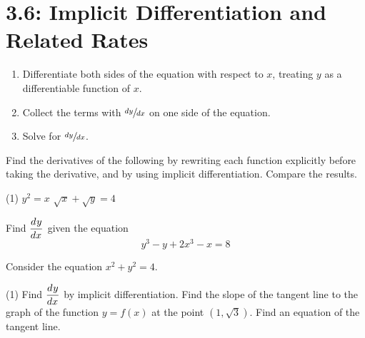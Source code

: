 \documentclass[../mathNotesPreamble]{subfiles}
\begin{document}
  \section{3.6: Implicit Differentiation and Related Rates}
  
  \pagebreak

  \begin{thmBox*}
    \begin{enumerate}
      \item Differentiate both sides of the equation with respect to $x$, treating $y$ as a \newline differentiable function of $x$.
      \item Collect the terms with $\sfrac{dy}{dx}$ on one side of the equation.
      \item Solve for $\sfrac{dy}{dx}$.
    \end{enumerate}
  \end{thmBox*}
  \begin{ex*}
    Find the derivatives of the following by rewriting each function explicitly before taking the derivative, and by using implicit differentiation. Compare the results.
  \end{ex*}
  \begin{extasks}[after-item-skip=\stretch{1}](1)
    \task $y^2=x$
    \task $\sqrt x+\sqrt y=4$
  \end{extasks}
  \pagebreak

  \begin{ex*}
    Find $\displaystyle{\frac{d^{}y}{dx^{}}}$ given the equation
    \[y^3-y+2x^3-x=8\]
  \end{ex*}
  \pagebreak
  
  \begin{ex*}
    Consider the equation $x^2+y^2=4$.
  \end{ex*}
  \begin{extasks}[after-item-skip=\stretch{1}](1)
    \task Find $\displaystyle{\frac{d^{}y}{dx^{}}}$ by implicit differentiation.
    \task Find the slope of the tangent line to the graph of the function $y=f(x)$ at the point $(1,\sqrt{3})$.
    \task Find an equation of the tangent line. 
  \end{extasks}
  \pagebreak
\end{document}
